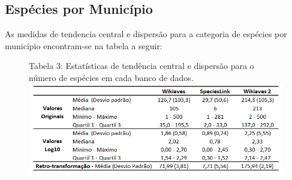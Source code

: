 \documentclass[12pt]{extarticle}
\newenvironment{resposta}{ \color{mygray}}{}
\begin{document}
\subsection{Espécies por Município}

\begin{resposta}
As medidas de tendencia central e dispersão para a categoria de espécies por município encontram-se na tabela a seguir: 
\end{resposta}


\begin{figure}[h!]
\centering
{\scriptsize Tabela 3: Estatísticas de tendência central e dispersão para o número de espécies em cada banco de dados.}
\includegraphics{Imagens/T03.png}
\end{figure}
\end{document}
